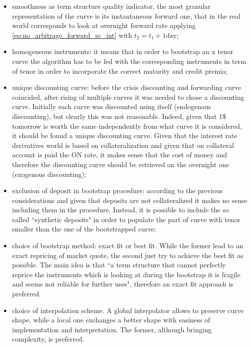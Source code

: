 \begin{itemize}
    \item smoothness as term structure quality indicator, the most granular representation of the curve is its instantaneous forward one, that in the real world corresponds to look at overnight forward rate applying \eqref{eq:no_arbitrage_forward_sc_int} with $t_{2} = t_{1} + 1 \text{day}$;
    
    \item homogeneous instruments: it means that in order to bootstrap an x tenor curve the algorithm has to be fed with the corresponding instruments in term of tenor in order to incorporate the correct maturity and credit premia;
    
    \item unique discounting curve: before the crisis discounting and forwarding curve coincided, after rising of multiple curves it was needed to chose a discounting curve. Initially each curve was discounted using itself (endogenous discounting), but clearly this was not reasonable. Indeed, given that 1\$ tomorrow is worth the same independently from what curve it is considered, it should be found a unique discounting curve.
    Given that the interest rate derivatives world is based on collateralization  and given that on collateral account is paid the ON rate, it makes sense that the cost of money and therefore the discounting curve should be retrieved on the overnight one (exogenous discounting);
    
    \item exclusion of deposit in bootstrap procedure: according to the previous considerations and given that deposits are not collateralized it makes no sense including them in the procedure. Instead, it is possible to include the so called ``synthetic deposits" in order to populate the part of curve with tenor smaller than the one of the bootstrapped curve;
    
    \item choice of bootstrap method: exact fit or best fit. While the former lead to an exact repricing of market quote, the second just try to achieve the best fit as possible. The main idea is that ``a term structure that cannot perfectly reprice the instruments which is looking at during the bootstrap it is fragile and seems not reliable for further uses", therefore an exact fit approach is preferred.
    \item choice of interpolation scheme. A global interpolator allows to preserve curve shape, while a local one exchanges a better shape with easiness of implementation and interpretation. The former, although bringing complexity, is preferred. 
\end{itemize}

